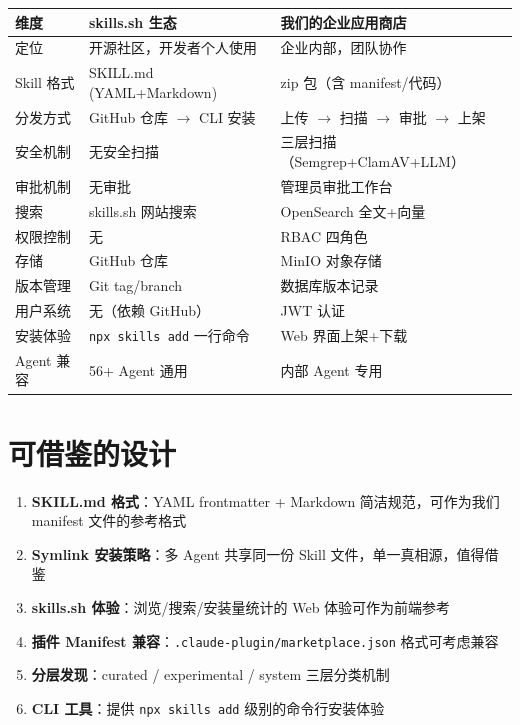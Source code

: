 \documentclass[11pt,a4paper]{article}
\begin{document}
\begin{table}[h]
\centering
\begin{tabularx}{\linewidth}{llX}
\toprule
\textbf{维度} & \textbf{skills.sh 生态} & \textbf{我们的企业应用商店} \\
\midrule
定位 & 开源社区，开发者个人使用 & 企业内部，团队协作 \\
Skill 格式 & SKILL.md (YAML+Markdown) & zip 包（含 manifest/代码） \\
分发方式 & GitHub 仓库 $\to$ CLI 安装 & 上传 $\to$ 扫描 $\to$ 审批 $\to$ 上架 \\
安全机制 & 无安全扫描 & 三层扫描（Semgrep+ClamAV+LLM） \\
审批机制 & 无审批 & 管理员审批工作台 \\
搜索 & skills.sh 网站搜索 & OpenSearch 全文+向量 \\
权限控制 & 无 & RBAC 四角色 \\
存储 & GitHub 仓库 & MinIO 对象存储 \\
版本管理 & Git tag/branch & 数据库版本记录 \\
用户系统 & 无（依赖 GitHub） & JWT 认证 \\
安装体验 & \texttt{npx skills add} 一行命令 & Web 界面上架+下载 \\
Agent 兼容 & 56+ Agent 通用 & 内部 Agent 专用 \\
\bottomrule
\end{tabularx}
\end{table}

\section{可借鉴的设计}

\begin{enumerate}[nosep]
  \item \textbf{SKILL.md 格式}：YAML frontmatter + Markdown 简洁规范，可作为我们 manifest 文件的参考格式
  \item \textbf{Symlink 安装策略}：多 Agent 共享同一份 Skill 文件，单一真相源，值得借鉴
  \item \textbf{skills.sh 体验}：浏览/搜索/安装量统计的 Web 体验可作为前端参考
  \item \textbf{插件 Manifest 兼容}：\texttt{.claude-plugin/marketplace.json} 格式可考虑兼容
  \item \textbf{分层发现}：curated / experimental / system 三层分类机制
  \item \textbf{CLI 工具}：提供 \texttt{npx skills add} 级别的命令行安装体验
\end{enumerate}
\end{document}
